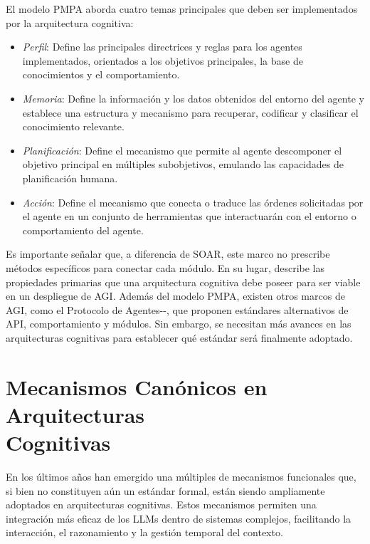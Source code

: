 El modelo PMPA aborda cuatro temas principales que deben ser implementados por
la arquitectura cognitiva: 
\begin{itemize}

\item \textit{Perfil}: Define las
    principales directrices y reglas para los agentes implementados, orientados a
    los objetivos principales, la base de conocimientos y el comportamiento.  

\item \textit{Memoria}: Define la información y los datos obtenidos del entorno del
    agente y establece una estructura y mecanismo para recuperar, codificar y
    clasificar el conocimiento relevante.  

\item \textit{Planificación}: Define el
    mecanismo que permite al agente descomponer el objetivo principal en múltiples
    subobjetivos, emulando las capacidades de planificación humana.  

\item \textit{Acción}: Define el mecanismo que conecta o traduce las órdenes
    solicitadas por el agente en un conjunto de herramientas que interactuarán con
    el entorno o comportamiento del agente.  

\end{itemize}

Es importante señalar que, a diferencia de SOAR, este marco no prescribe métodos
específicos para conectar cada módulo. En su lugar, describe las propiedades
primarias que una arquitectura cognitiva debe poseer para ser viable en un
despliegue de AGI. Además del modelo PMPA, existen otros marcos de AGI, como el
Protocolo de Agentes-\citet{engineerfoundation2023ap}-, que proponen estándares
alternativos de API, comportamiento y módulos. Sin embargo, se necesitan más
avances en las arquitecturas cognitivas para establecer qué estándar será
finalmente adoptado.

\section[Mecanismos Canónicos en Arquitecturas Cognitivas]{Mecanismos Canónicos en Arquitecturas \\Cognitivas}

\label{sec:canonical_mechanisms}
En los últimos años han emergido una múltiples de mecanismos funcionales que, 
si bien no constituyen aún un estándar formal, están siendo ampliamente 
adoptados en arquitecturas cognitivas. Estos mecanismos permiten una integración 
más eficaz de los LLMs dentro de sistemas complejos, facilitando la interacción,
el razonamiento y la gestión temporal del contexto.

